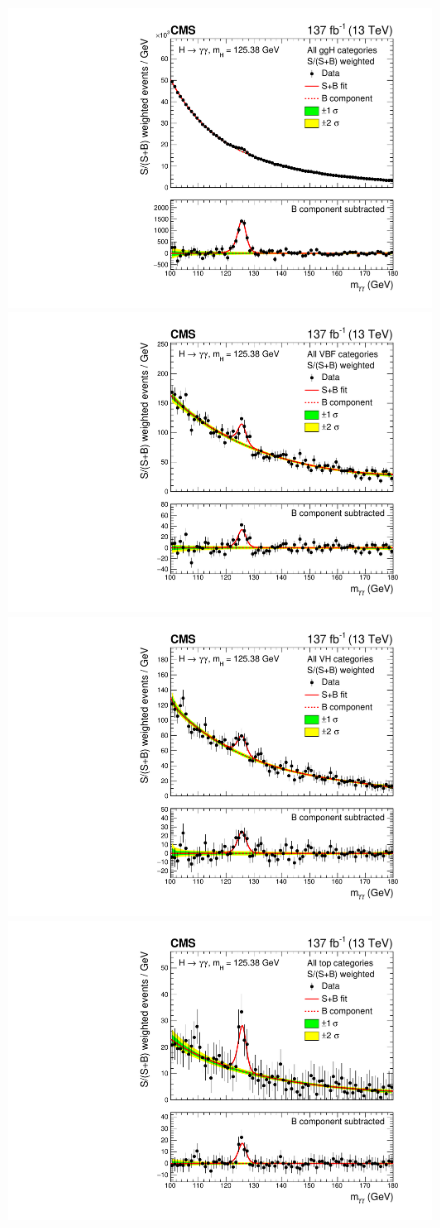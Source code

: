\begin{figure}[htb!]
  \centering
  \includegraphics[width=.49\textwidth]{Figures/hgg_results/sPlusBweighted_ggH.pdf}
  \includegraphics[width=.49\textwidth]{Figures/hgg_results/sPlusBweighted_VBF.pdf}
  \includegraphics[width=.49\textwidth]{Figures/hgg_results/sPlusBweighted_VH.pdf}
  \includegraphics[width=.49\textwidth]{Figures/hgg_results/sPlusBweighted_top.pdf}
  \caption[Observed diphoton mass distribution for groups of categories targeting different Higgs boson production modes]
  {
}
\end{figure}
